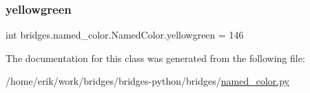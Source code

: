 \subsubsection{\texorpdfstring{yellowgreen}{yellowgreen}}
{\footnotesize\ttfamily int bridges.\+named\+\_\+color.\+Named\+Color.\+yellowgreen = 146\hspace{0.3cm}{\ttfamily [static]}}



The documentation for this class was generated from the following file\+:\begin{DoxyCompactItemize}
\item 
/home/erik/work/bridges/bridges-\/python/bridges/\hyperlink{named__color_8py}{named\+\_\+color.\+py}\end{DoxyCompactItemize}
